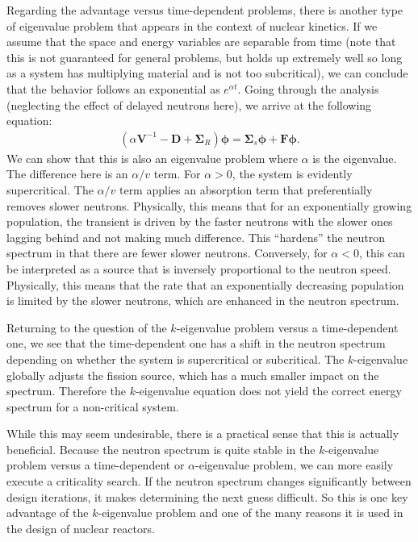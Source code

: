 Regarding the advantage versus time-dependent problems, there is another type of eigenvalue problem that appears in the context of nuclear kinetics. If we assume that the space and energy variables are separable from time (note that this is not guaranteed for general problems, but holds up extremely well so long as a system has multiplying material and is not too subcritical), we can conclude that the behavior follows an exponential as $e^{\alpha t}$. Going through the analysis (neglecting the effect of delayed neutrons here), we arrive at the following equation:
\begin{align}
  \left( \alpha \mathbf{V}^{-1}  - \mathbf{D} + \boldsymbol\Sigma_R \right) \boldsymbol\phi
  =  \boldsymbol\Sigma_s \boldsymbol\phi + \mathbf{F} \boldsymbol\phi .
\end{align}
We can show that this is also an eigenvalue problem where $\alpha$ is the eigenvalue. The difference here is an $\alpha/v$ term. For $\alpha > 0$, the system is evidently supercritical. The $\alpha/v$ term applies an absorption term that preferentially removes slower neutrons. Physically, this means that for an exponentially growing population, the transient is driven by the faster neutrons with the slower ones lagging behind and not making much difference. This ``hardens'' the neutron spectrum in that there are fewer slower neutrons. Conversely, for $\alpha < 0$, this can be interpreted as a source that is inversely proportional to the neutron speed. Physically, this means that the rate that an exponentially decreasing population is limited by the slower neutrons, which are enhanced in the neutron spectrum.

Returning to the question of the $k$-eigenvalue problem versus a time-dependent one, we see that the time-dependent one has a shift in the neutron spectrum depending on whether the system is supercritical or subcritical. The $k$-eigenvalue globally adjusts the fission source, which has a much smaller impact on the spectrum. Therefore the $k$-eigenvalue equation does not yield the correct energy spectrum for a non-critical system. 

While this may seem undesirable, there is a practical sense that this is actually beneficial. Because the neutron spectrum is quite stable in the $k$-eigenvalue problem versus a time-dependent or $\alpha$-eigenvalue problem, we can more easily execute a criticality search. If the neutron spectrum changes significantly between design iterations, it makes determining the next guess difficult. So this is one key advantage of the $k$-eigenvalue problem and one of the many reasons it is used in the design of nuclear reactors.

